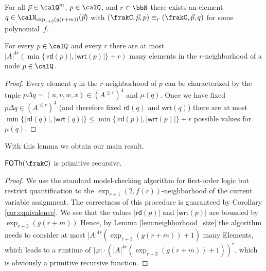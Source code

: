 \documentclass[a4paper,numberwithinsect,USenglish]{lipics-v2018}
\theoremstyle{plain}
\theoremstyle{remark}
\newcommand{\classfont}[1]{\mathsf{#1}}
\newcommand{\rd}[1]{\mathsf{rd}(#1)}
\newcommand{\wrt}[1]{\mathsf{wrt}(#1)}
\newcommand{\Qx}{\calQ}
\newcommand{\mddl}[1]{\mu(#1)}
\newcommand{\FOTh}[1]{\classfont{FOTh}(#1)}
\renewcommand{\phi}{\varphi}
\renewcommand{\epsilon}{\varepsilon}
\renewcommand{\theta}{\vartheta}
\renewcommand{\rho}{\varrho}
\begin{document}
\begin{corollary}\label{cor:equivalence}
	For all $\vec{p}\in \Qx^m$, $p\in \Qx$, and $r\in\bbN$ there exists an element $q\in \calN_{\exp_{r+3}(g(r+m))}(\vec{p})$ with $(\frakC, \vec{p}, p) \equiv_r (\frakC,\vec{p}, q)$ for some polynomial~$f$.
\end{corollary}
\begin{lemma}\label{lem:neighborhood_size}
	For every $p\in \Qx$ and every $r$ there are at most $|A|^{4r} (\min\{|\rd{p}|, |\wrt{p}|\} + r)$ many elements in the $r$-neighborhood of a node $p\in \Qx$. 
\end{lemma}
\begin{proof}
	Every element $q$ in the $r$-neighborhood of $p$ can be characterized by the tuple $p\Delta q = (u,v, w, x)\in (A^{\leq r})^4$ and $\mddl{q}$. Once we have fixed  
	$p\Delta q \in (A^{\leq r})^4$ (and therefore fixed $\rd{q}$ and $\wrt{q}$) there are at most $\min\{ |\rd{q}|, |\wrt{q}| \} \leq \min\{ |\rd{p}|, |\wrt{p}| \} + r$ possible values for $\mddl{q}$.
\end{proof}

With this lemma we obtain our main result.

\begin{theorem}
	$\FOTh{\frakC}$ is primitive recursive.
\end{theorem}
\begin{proof}
	We use the standard model-checking algorithm for first-order logic but restrict quantification to the $\exp_{r+1}(2,f(r))$-neighborhood of the current variable assignment. The correctness of this procedure is guaranteed by Corollary \ref{cor:equivalence}.
	We see that the values $|\rd{p}|$ and $|\wrt{p}|$ are bounded by $\exp_{r+3}(g(r+m))$
	Hence, by Lemma \ref{lem:neighborhood_size} the algorithm needs to consider at most $|A|^{4r} (\exp_{r+3}(g(r+m)) +1)$ many Elements, which leads to a runtime of
	$|\phi| \cdot (|A|^{4r} (\exp_{r+3}(g(r+m)) +1))^r$, which is obviously a primitive recursive function. 
\end{proof}
\end{document}
